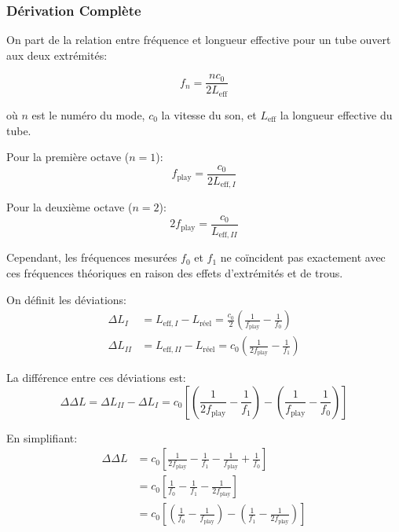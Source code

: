 \documentclass[12pt,a4paper,twocolumn]{article}
\newcommand{\freqzero}{f_0}
\newcommand{\freqone}{f_1}
\newcommand{\freqplay}{f_{\text{play}}}
\begin{document}
\subsubsection{Dérivation Complète}

On part de la relation entre fréquence et longueur effective pour un tube ouvert aux deux extrémités:

\begin{equation}
f_n = \frac{n c_0}{2 L_{\text{eff}}}
\label{eq:frequence_tube}
\end{equation}

où $n$ est le numéro du mode, $c_0$ la vitesse du son, et $L_{\text{eff}}$ la longueur effective du tube.

Pour la première octave ($n=1$):
\begin{equation}
\freqplay = \frac{c_0}{2 L_{\text{eff},I}}
\label{eq:freq_play_I}
\end{equation}

Pour la deuxième octave ($n=2$):
\begin{equation}
2\freqplay = \frac{c_0}{L_{\text{eff},II}}
\label{eq:freq_play_II}
\end{equation}

Cependant, les fréquences mesurées $\freqzero$ et $\freqone$ ne coïncident pas exactement avec ces fréquences théoriques en raison des effets d'extrémités et de trous.

On définit les déviations:
\begin{align}
\Delta L_I &= L_{\text{eff},I} - L_{\text{réel}} = \frac{c_0}{2}\left(\frac{1}{\freqplay} - \frac{1}{\freqzero}\right) \\
\Delta L_{II} &= L_{\text{eff},II} - L_{\text{réel}} = c_0\left(\frac{1}{2\freqplay} - \frac{1}{\freqone}\right)
\label{eq:deviations_longueur}
\end{align}

La différence entre ces déviations est:
\begin{equation}
\Delta\Delta L = \Delta L_{II} - \Delta L_I = c_0\left[\left(\frac{1}{2\freqplay} - \frac{1}{\freqone}\right) - \left(\frac{1}{\freqplay} - \frac{1}{\freqzero}\right)\right]
\label{eq:delta_delta_L}
\end{equation}

En simplifiant:
\begin{align}
\Delta\Delta L &= c_0\left[\frac{1}{2\freqplay} - \frac{1}{\freqone} - \frac{1}{\freqplay} + \frac{1}{\freqzero}\right] \\
&= c_0\left[\frac{1}{\freqzero} - \frac{1}{\freqone} - \frac{1}{2\freqplay}\right] \\
&= c_0\left[\left(\frac{1}{\freqzero} - \frac{1}{\freqplay}\right) - \left(\frac{1}{\freqone} - \frac{1}{2\freqplay}\right)\right]
\label{eq:delta_delta_L_simplifie}
\end{align}
\end{document}
